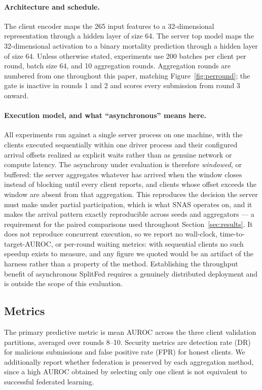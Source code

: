 \documentclass[pdflatex,sn-mathphys-num]{sn-jnl}
\begin{document}
\paragraph{Architecture and schedule.} The client encoder maps the 265 input features to a 32-dimensional representation through a hidden layer of size 64. The server top model maps the 32-dimensional activation to a binary mortality prediction through a hidden layer of size 64. Unless otherwise stated, experiments use 200 batches per client per round, batch size 64, and 10 aggregation rounds. Aggregation rounds are numbered from one throughout this paper, matching Figure~\ref{fig:perround}; the gate is inactive in rounds 1 and 2 and scores every submission from round 3 onward.

\paragraph{Execution model, and what ``asynchronous'' means here.} All experiments run against a single server process on one machine, with the clients executed sequentially within one driver process and their configured arrival offsets realized as explicit waits rather than as genuine network or compute latency. The asynchrony under evaluation is therefore \emph{windowed}, or buffered: the server aggregates whatever has arrived when the window closes instead of blocking until every client reports, and clients whose offset exceeds the window are absent from that aggregation. This reproduces the decision the server must make under partial participation, which is what SNAS operates on, and it makes the arrival pattern exactly reproducible across seeds and aggregators --- a requirement for the paired comparisons used throughout Section~\ref{sec:results}. It does not reproduce concurrent execution, so we report no wall-clock, time-to-target-AUROC, or per-round waiting metrics: with sequential clients no such speedup exists to measure, and any figure we quoted would be an artifact of the harness rather than a property of the method. Establishing the throughput benefit of asynchronous SplitFed requires a genuinely distributed deployment and is outside the scope of this evaluation.

\subsection{Metrics}

The primary predictive metric is mean AUROC across the three client validation partitions, averaged over rounds 8--10. Security metrics are detection rate (DR) for malicious submissions and false positive rate (FPR) for honest clients. We additionally report whether federation is preserved by each aggregation method, since a high AUROC obtained by selecting only one client is not equivalent to successful federated learning.
\end{document}
